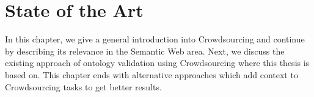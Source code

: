 \chapter{State of the Art}\label{chap:state_of_the_art}
In this chapter, we give a general introduction into Crowdsourcing and continue by describing its relevance in the Semantic Web area. Next, we discuss the existing approach of ontology validation using Crowdsourcing where this thesis is based on. This chapter ends with alternative approaches which add context to Crowdsourcing tasks to get better results. 












